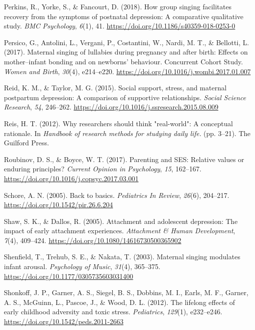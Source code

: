 \documentclass[
]{article}
\newlength{\cslhangindent}
\newenvironment{CSLReferences}[2] %
 {\begin{list}{}{%
  \setlength{\itemindent}{0pt}
  \setlength{\leftmargin}{0pt}
  \setlength{\parsep}{0pt}
  \ifodd #1
   \setlength{\leftmargin}{\cslhangindent}
   \setlength{\itemindent}{-1\cslhangindent}
  \fi
  \setlength{\itemsep}{#2\baselineskip}}}
 {\end{list}}
\begin{document}
\begin{CSLReferences}{1}{0}
Perkins, R., Yorke, S., \& Fancourt, D. (2018). How group singing
facilitates recovery from the symptoms of postnatal depression: A
comparative qualitative study. \emph{BMC Psychology}, \emph{6}(1), 41.
\url{https://doi.org/10.1186/s40359-018-0253-0}

Persico, G., Antolini, L., Vergani, P., Costantini, W., Nardi, M. T., \&
Bellotti, L. (2017). Maternal singing of lullabies during pregnancy and
after birth: {Effects} on mother--infant bonding and on newborns'
behaviour. {Concurrent Cohort Study}. \emph{Women and Birth},
\emph{30}(4), e214--e220.
\url{https://doi.org/10.1016/j.wombi.2017.01.007}

Reid, K. M., \& Taylor, M. G. (2015). Social support, stress, and
maternal postpartum depression: {A} comparison of supportive
relationships. \emph{Social Science Research}, \emph{54}, 246--262.
\url{https://doi.org/10.1016/j.ssresearch.2015.08.009}

Reis, H. T. (2012). Why researchers should think "real-world": {A}
conceptual rationale. In \emph{Handbook of research methods for studying
daily life.} (pp. 3--21). The Guilford Press.

Roubinov, D. S., \& Boyce, W. T. (2017). Parenting and {SES}: {Relative}
values or enduring principles? \emph{Current Opinion in Psychology},
\emph{15}, 162--167. \url{https://doi.org/10.1016/j.copsyc.2017.03.001}

Schore, A. N. (2005). Back to basics. \emph{Pediatrics In Review},
\emph{26}(6), 204--217. \url{https://doi.org/10.1542/pir.26.6.204}

Shaw, S. K., \& Dallos, R. (2005). Attachment and adolescent depression:
{The} impact of early attachment experiences. \emph{Attachment \& Human
Development}, \emph{7}(4), 409--424.
\url{https://doi.org/10.1080/14616730500365902}

Shenfield, T., Trehub, S. E., \& Nakata, T. (2003). Maternal singing
modulates infant arousal. \emph{Psychology of Music}, \emph{31}(4),
365--375. \url{https://doi.org/10.1177/0305735603031400}

Shonkoff, J. P., Garner, A. S., Siegel, B. S., Dobbins, M. I., Earls, M.
F., Garner, A. S., McGuinn, L., Pascoe, J., \& Wood, D. L. (2012). The
lifelong effects of early childhood adversity and toxic stress.
\emph{Pediatrics}, \emph{129}(1), e232--e246.
\url{https://doi.org/10.1542/peds.2011-2663}


\end{CSLReferences}
\end{document}
